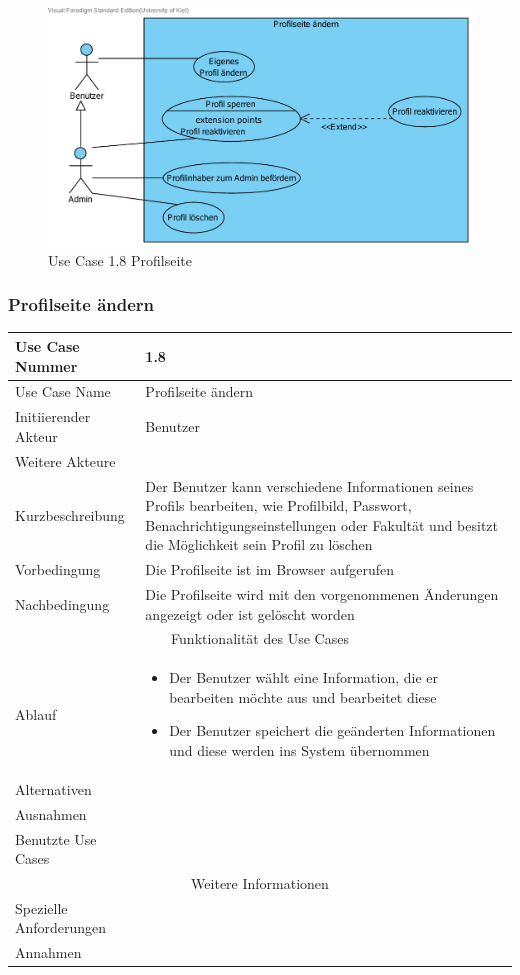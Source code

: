 \documentclass[10pt,a4paper]{article}
\begin{document}
	\begin{figure}[H]
	\centering
		\includegraphics[width=\linewidth]{gfx/webseite/Profilseite.pdf}
		\caption{Use Case 1.8 Profilseite}
	\end{figure}
	\subsubsection{Profilseite \"andern}
		\begin{tabularx}{\textwidth}{|l|X|}
		\hline Use Case Nummer & 1.8 \\ 
		\hline Use Case Name & Profilseite \"andern \\ 
		\hline Initiierender Akteur & Benutzer \\
		\hline Weitere Akteure & \\
		\hline Kurzbeschreibung & Der Benutzer kann verschiedene Informationen seines Profils bearbeiten, wie Profilbild, Passwort, Benachrichtigungseinstellungen oder Fakultät und besitzt die Möglichkeit sein Profil zu löschen \\
		\hline Vorbedingung & Die Profilseite ist im Browser aufgerufen \\
		\hline Nachbedingung & Die Profilseite wird mit den vorgenommenen \"Anderungen angezeigt oder ist gel\"oscht worden \\
		\hline \multicolumn{2}{|c|}{Funktionalität des Use Cases}\\
		\hline Ablauf & \begin{itemize}
					\item Der Benutzer w\"ahlt eine Information, die er bearbeiten m\"ochte aus und bearbeitet diese
					\item Der Benutzer speichert die ge\"anderten Informationen und diese werden ins System \"ubernommen
				\end{itemize}\\
		\hline Alternativen & \\
		\hline Ausnahmen & \\
		\hline Benutzte Use Cases & \\
		\hline \multicolumn{2}{|c|}{Weitere Informationen} \\
		\hline Spezielle Anforderungen &  \\
		\hline Annahmen &  \\
		\hline
		\end{tabularx}
		
\end{document}
